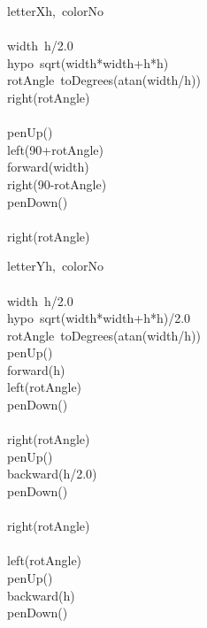 \documentclass[a4paper,10pt]{article}
\begin{document}
\begin{pseudocode}{letterX}{h,\ colorNo }
\label{letterX}
\\
\\
  width\gets\ h/2.0\\
  hypo\gets\ sqrt(width*width+h*h)\\
  rotAngle\gets\ toDegrees(atan(width/h))\\
  right(rotAngle)\\
  \\
  penUp()\\
  left(90+rotAngle)\\
  forward(width)\\
  right(90-rotAngle)\\
  penDown()\\
  \\
  right(rotAngle)\\
\ENDPROCEDURE
\end{pseudocode}


\begin{pseudocode}{letterY}{h,\ colorNo }
\label{letterY}
\\
\\
  width\gets\ h/2.0\\
  hypo\gets\ sqrt(width*width+h*h)/2.0\\
  rotAngle\gets\ toDegrees(atan(width/h))\\
  penUp()\\
  forward(h)\\
  left(rotAngle)\\
  penDown()\\
  \\
  right(rotAngle)\\
  penUp()\\
  backward(h/2.0)\\
  penDown()\\
  \\
  right(rotAngle)\\
  \\
  left(rotAngle)\\
  penUp()\\
  backward(h)\\
  penDown()\\
\ENDPROCEDURE
\end{pseudocode}
\end{document}
